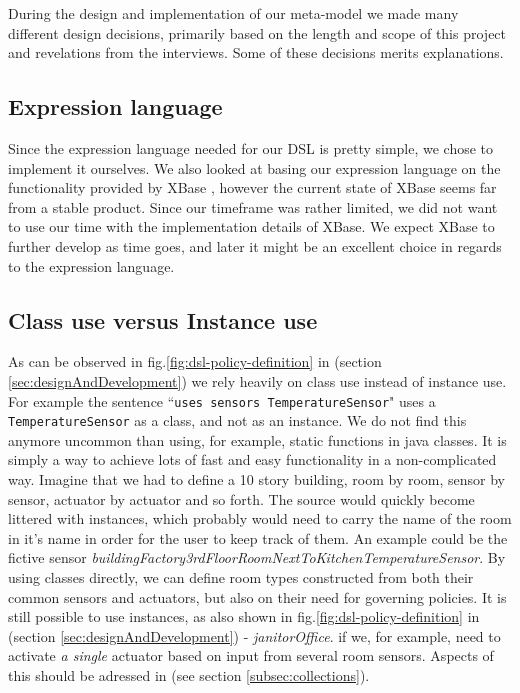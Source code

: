During the design and implementation of our meta-model we made many different design decisions, primarily based on the length and scope of this project and revelations from the interviews. Some of these decisions merits explanations.

\subsection{Expression language}
Since the expression language needed for our DSL is pretty simple, we chose to implement it ourselves. We also looked at basing our expression language on the functionality provided by XBase \cite{xbase}, however the current state of XBase seems far from a stable product. Since our timeframe was rather limited, we did not want to use our time with the implementation details of XBase. We expect XBase to further develop as time goes, and later it might be an excellent choice in regards to the expression language.

\subsection{Class use versus Instance use}
As can be observed in fig.\ref{fig:dsl-policy-definition} in  (section \ref{sec:designAndDevelopment}) we rely heavily on class use instead of instance use. For example the sentence ``\texttt{uses sensors TemperatureSensor}" uses a \texttt{TemperatureSensor} as a class, and not as an instance. We do not find this anymore uncommon than using, for example, static functions in java classes. It is simply a way to achieve lots of fast and easy functionality in a non-complicated way. Imagine that we had to define a 10 story building, room by room, sensor by sensor, actuator by actuator and so forth. The source would quickly become littered with instances, which probably would need to carry the name of the room in it's name in order for the user to keep track of them. An example could be the fictive sensor \textit{buildingFactory3rdFloorRoomNextToKitchenTemperatureSensor}. By using classes directly, we can define room types constructed from both their common sensors and actuators, but also on their need for governing policies. It is still possible to use instances, as also shown in fig.\ref{fig:dsl-policy-definition} in  (section \ref{sec:designAndDevelopment}) - \textit{janitorOffice}. if we, for example, need to activate \textit{a single} actuator based on input from several room sensors. Aspects of this should be adressed in  (see section \ref{subsec:collections}).
